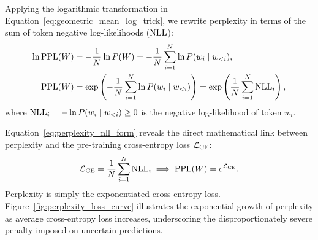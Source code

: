 \documentclass[../../../main.tex]{subfiles}
\begin{document}
Applying the logarithmic transformation in Equation~\eqref{eq:geometric_mean_log_trick}, we rewrite perplexity in terms of the sum of token negative log-likelihoods ($\mathrm{NLL}$):
\begin{align}
\ln \mathrm{PPL}(W) &= -\frac{1}{N} \ln P(W) = -\frac{1}{N} \sum_{i=1}^N \ln P(w_i \mid w_{<i}), \\
\label{eq:perplexity_nll_form}
\mathrm{PPL}(W) &= \exp\left( -\frac{1}{N} \sum_{i=1}^N \ln P(w_i \mid w_{<i}) \right) = \exp\left( \frac{1}{N} \sum_{i=1}^N \mathrm{NLL}_i \right),
\end{align}
where $\mathrm{NLL}_i = -\ln P(w_i \mid w_{<i}) \ge 0$ is the negative log-likelihood of token $w_i$.

Equation~\eqref{eq:perplexity_nll_form} reveals the direct mathematical link between perplexity and the pre-training cross-entropy loss $\mathcal{L}_{\text{CE}}$:
\begin{equation}
\label{eq:perplexity_cross_entropy_equiv}
\mathcal{L}_{\text{CE}} = \frac{1}{N} \sum_{i=1}^N \mathrm{NLL}_i \implies \mathrm{PPL}(W) = e^{\mathcal{L}_{\text{CE}}}.
\end{equation}
Perplexity is simply the exponentiated cross-entropy loss. Figure~\ref{fig:perplexity_loss_curve} illustrates the exponential growth of perplexity as average cross-entropy loss increases, underscoring the disproportionately severe penalty imposed on uncertain predictions.
\end{document}
